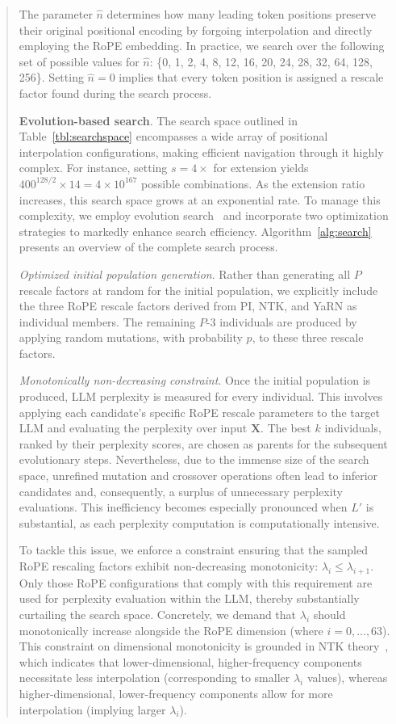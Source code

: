 \begin{abstract}
The parameter $\hat{n}$ determines how many leading token positions preserve their original positional encoding by forgoing interpolation and directly employing the RoPE embedding. In practice, we search over the following set of possible values for $\hat{n}$: \{0, 1, 2, 4, 8, 12, 16, 20, 24, 28, 32, 64, 128, 256\}. Setting $\hat{n}=0$ implies that every token position is assigned a rescale factor found during the search process.

\textbf{Evolution-based search}. The search space outlined in Table~\ref{tbl:searchspace} encompasses a wide array of positional interpolation configurations, making efficient navigation through it highly complex. For instance, setting $s=4\times$ for extension yields $400^{128/2}\times14 = 4\times10^{167}$ possible combinations. As the extension ratio increases, this search space grows at an exponential rate. To manage this complexity, we employ evolution search~\cite{guo2020single} and incorporate two optimization strategies to markedly enhance search efficiency. Algorithm~\ref{alg:search} presents an overview of the complete search process.

\textit{Optimized initial population generation}. Rather than generating all $P$ rescale factors at random for the initial population, we explicitly include the three RoPE rescale factors derived from PI, NTK, and YaRN as individual members. The remaining $P$-3 individuals are produced by applying random mutations, with probability $p$, to these three rescale factors.

\textit{Monotonically non-decreasing constraint}. Once the initial population is produced, LLM perplexity is measured for every individual. This involves applying each candidate’s specific RoPE rescale parameters to the target LLM and evaluating the perplexity over input $\mathbf{X}$. The best $k$ individuals, ranked by their perplexity scores, are chosen as parents for the subsequent evolutionary steps. Nevertheless, due to the immense size of the search space, unrefined mutation and crossover operations often lead to inferior candidates and, consequently, a surplus of unnecessary perplexity evaluations. This inefficiency becomes especially pronounced when $L'$ is substantial, as each perplexity computation is computationally intensive.

To tackle this issue, we enforce a constraint ensuring that the sampled RoPE rescaling factors exhibit non-decreasing monotonicity: $\lambda_i \le \lambda_{i+1}$. Only those RoPE configurations that comply with this requirement are used for perplexity evaluation within the LLM, thereby substantially curtailing the search space. Concretely, we demand that $\lambda_i$ should monotonically increase alongside the RoPE dimension (where $i=0, \ldots, 63$). This constraint on dimensional monotonicity is grounded in NTK theory~\cite{jacot2018neural,tancik2020fourier,ntk}, which indicates that lower-dimensional, higher-frequency components necessitate less interpolation (corresponding to smaller $\lambda_i$ values), whereas higher-dimensional, lower-frequency components allow for more interpolation (implying larger $\lambda_i$).


\end{abstract}
